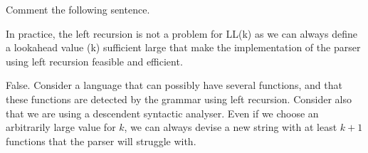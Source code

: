 \documentclass[docid=2021]{comp_exam_round1}
\begin{document}
\vspace{-1em}
\begin{center}
    \ttfamily\small
\end{center}

\examgroup{}

Comment the following sentence.

\question
In practice, the left recursion is not a problem for LL(k) as we can always define a lookahead value (k) sufficient large that make the implementation of the parser using left recursion feasible and efficient.

\ansseparator

False. Consider a language that can possibly have several functions, and that these functions are detected by the grammar using left recursion. Consider also that we are using a descendent syntactic analyser. Even if we choose an arbitrarily large value for $k$, we can always devise a new string with at least $k+1$ functions that the parser will struggle with.
\end{document}
